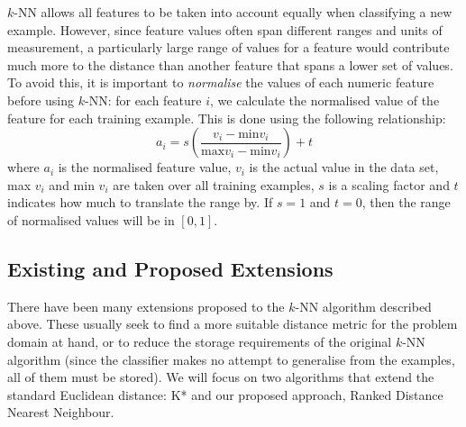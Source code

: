 \documentclass{article}
\begin{document}
$k$-NN allows all features to be taken
into account equally when classifying a new example. However, since feature
values often span different ranges and units of measurement, a particularly
large range of values for a feature would contribute much more to the distance
than another feature that spans a lower set of values.
To avoid this, it is important to \textit{normalise} the
values of each numeric feature before using $k$-NN: for each feature $i$, we
calculate the normalised value of the feature for each training example. This
is done using the following relationship:
\begin{equation}
\label{eq:normalise}
a_i = s\left(\dfrac{v_i - \mathrm{min }v_i}{\mathrm{max }v_i - \mathrm{min }v_i}\right) + t
\end{equation}
where $a_i$ is the normalised feature value, $v_i$ is the actual value in the
data set, max $v_i$ and min $v_i$ are taken over all training examples, $s$ is
a scaling factor and $t$ indicates how much to translate the range by. If $s=1$
and $t=0$, then the range of normalised values will be in $[0,1]$.

\subsection{Existing and Proposed Extensions}
There have been many extensions proposed to the $k$-NN algorithm described
above. These usually seek to find a more suitable distance metric for the
problem domain at hand, or to reduce the storage requirements of the original
$k$-NN algorithm (since the classifier makes no attempt to generalise from the
examples, all of them must be stored).
We will focus on two algorithms that extend the standard Euclidean distance:
K* and our proposed approach, Ranked Distance Nearest Neighbour.
\end{document}
